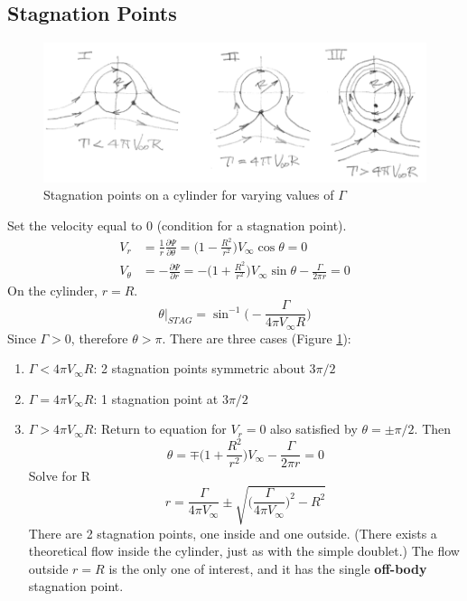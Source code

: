 \documentclass[draft=false, titlepage]{article}
\newcommand{\partialfrac}[2]{\frac{\partial #1}{\partial #2}}
\begin{document}
 \subsection{Stagnation Points}
 \begin{figure}[ht]
     \centering
     \includegraphics[width=0.8\linewidth]{Figures/stagnationPoints.PNG}
     \caption{Stagnation points on a cylinder for varying values of $\Gamma$}
     \label{fig:StagnationPoints}
 \end{figure}
 Set the velocity equal to 0 (condition for a stagnation point).
 \begin{align*}
     V_r &= \frac{1}{r} \partialfrac{\Psi}{\theta} = \Big( 1-\frac{R^2}{r^2} \Big)V_\infty \cos\theta = 0\\
     V_\theta &= -\partialfrac{\Psi}{r} = -\Big( 1+\frac{R^2}{r^2}\Big) V_\infty \sin\theta - \frac{\Gamma}{2\pi r} = 0
 \end{align*}
 On the cylinder, $r=R$.
 \begin{equation*}
     \theta \big|_{STAG} = \sin^{-1}\big( -\frac{\Gamma}{4\pi V_\infty R} \big)
 \end{equation*}
 Since $\Gamma > 0$, therefore $\theta > \pi$. There are three cases (Figure \ref{fig:StagnationPoints}):
 \begin{enumerate}
     \item $\Gamma < 4\pi V_\infty R$: 2 stagnation points symmetric about $3\pi/2$
     \item $\Gamma = 4\pi V_\infty R$: 1 stagnation point at $3\pi/2$
     \item $\Gamma > 4\pi V_\infty R$: Return to equation for $V_r = 0$ also satisfied by $\theta = \pm \pi/2$. Then $$\theta = \mp \Big( 1+\frac{R^2}{r^2} \Big)V_\infty - \frac{\Gamma}{2\pi r} = 0$$
    Solve for R
    \begin{equation*}
        r = \frac{\Gamma}{4\pi V_\infty} \pm \sqrt{ \Big( \frac{\Gamma}{4\pi V_\infty} \Big)^2 - R^2 }
    \end{equation*}
    There are 2 stagnation points, one inside and one outside. (There exists a theoretical flow inside the cylinder, just as with the simple doublet.) The flow outside $r=R$ is the only one of interest, and it has the single \textbf{off-body} stagnation point.
 \end{enumerate}
 
\end{document}
